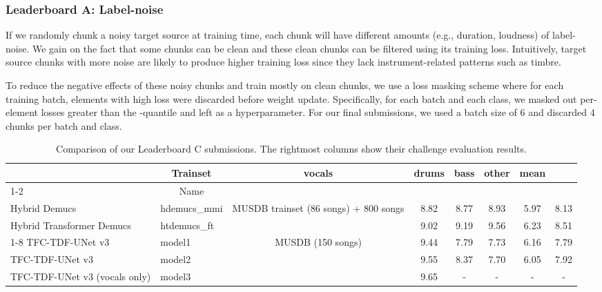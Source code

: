 \documentclass[10pt]{article}
\begin{document}
\subsubsection{Leaderboard A: Label-noise}
\label{sssec:ab_method_a}
If we randomly chunk a noisy target source at training time, each chunk will have different amounts (e.g., duration, loudness) of label-noise. We gain on the fact that some chunks can be clean and these clean chunks can be filtered using its training loss. Intuitively, target source chunks with more noise are likely to produce higher training loss since they lack instrument-related patterns such as timbre. 

To reduce the negative effects of these noisy chunks and train mostly on clean chunks, we use a loss masking scheme where for each training batch, elements with high loss were discarded before weight update. Specifically, for each batch and each class, we masked out per-element losses greater than the -quantile and left  as a hyperparameter. For our final submissions, we used a batch size of 6 and discarded 4 chunks per batch and class.


\begingroup
\setlength{\tabcolsep}{2.5pt}
\renewcommand{\arraystretch}{1.0}
\begin{table*}[t]
\centering
\begin{tabular}{l|l|c|ccccc}
\noalign{\smallskip}\noalign{\smallskip}\hline\hline
\multicolumn{2}{c|}{Model} & \multicolumn{1}{c|}{\multirow{2}{*}{Trainset}} & \multirow{2}{*}{vocals} & \multirow{2}{*}{drums} & \multirow{2}{*}{bass} & \multirow{2}{*}{other} & \multirow{2}{*}{mean} \\
\cline{1-2} \multicolumn{1}{c|}{Architecture} & \multicolumn{1}{c|}{Name} & \multicolumn{1}{c|}{} \\
\hline
Hybrid Demucs & hdemucs\_mmi & \multicolumn{1}{c|}{\multirow{2}{*}{MUSDB trainset (86 songs) + 800 songs}} & 8.82 & 8.77 & 8.93 & 5.97 & 8.13 \\
Hybrid Transformer Demucs & htdemucs\_ft & \multicolumn{1}{c|}{} & 9.02 & 9.19 & 9.56 & 6.23 & 8.51 \\
\cline{1-8}
TFC-TDF-UNet v3 & model1 & \multicolumn{1}{c|}{\multirow{3}{*}{MUSDB (150 songs)}} & 9.44 & 7.79 & 7.73 & 6.16 & 7.79 \\
TFC-TDF-UNet v3 & model2 & \multicolumn{1}{c|}{} & 9.55 & 8.37 & 7.70 & 6.05 & 7.92 \\
TFC-TDF-UNet v3 (vocals only) & model3 & \multicolumn{1}{c|}{} & 9.65 & - & - & - & - \\
\hline
\hline
\end{tabular}
\caption{
Comparison of our Leaderboard C submissions. The rightmost columns show their challenge evaluation results.
}
\label{tab:C}
\end{table*}
\endgroup
\end{document}
